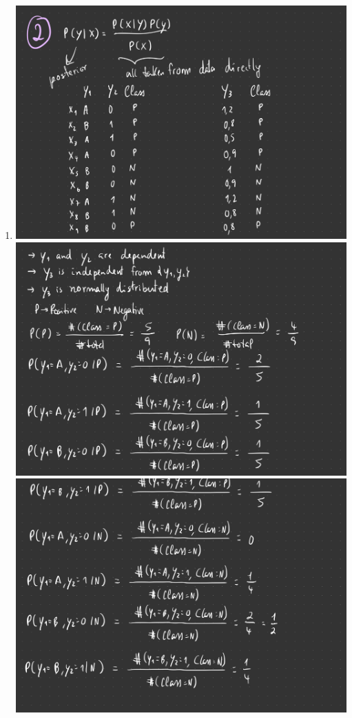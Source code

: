 \documentclass[12pt]{article}
\begin{document}
\begin{enumerate}[leftmargin=\labelsep]
\item \leavevmode\vadjust{\vspace{-\baselineskip}}
\begin{center}
\includegraphics[scale=0.2]{images/Project-10.jpg}
\newline
\includegraphics[scale=0.2]{images/Project-12.jpg}
\newline
\includegraphics[scale=0.2]{images/Project-13.jpg}

\end{center}
\end{enumerate}
\end{document}
